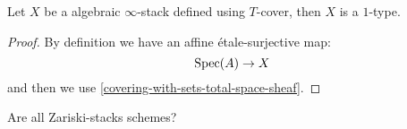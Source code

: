 \begin{corollary}
Let $X$ be a algebraic $\infty$-stack defined using $T$-cover, then $X$ is a $1$-type.
\end{corollary}

\begin{proof}
By definition we have an affine étale-surjective map:
\[\operatorname{Spec}(A)\to X\]
 and then we use \cref{covering-with-sets-total-space-sheaf}.
\end{proof}

\begin{remark}
Are all Zariski-stacks schemes?
\end{remark}







